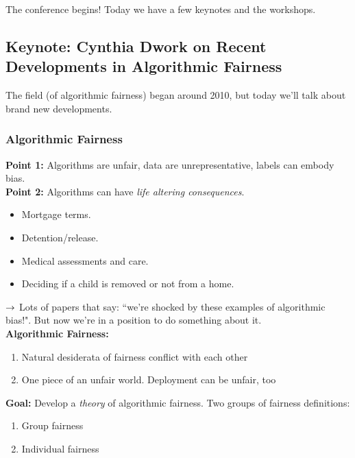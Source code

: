 The conference begins! Today we have a few keynotes and the workshops.


\subsection{Keynote: Cynthia Dwork on Recent Developments in Algorithmic Fairness}

The field (of algorithmic fairness) began around 2010, but today we'll talk about brand new developments.

\subsubsection{Algorithmic Fairness}

{\bf Point 1:} Algorithms are unfair, data are unrepresentative, labels can embody bias. \\

{\bf Point 2:} Algorithms can have {\it life altering consequences}.
\begin{itemize}
    \item Mortgage terms.
    \item Detention/release.
    \item Medical assessments and care.
    \item Deciding if a child is removed or not from a home.
\end{itemize}

$\rightarrow$ Lots of papers that say: ``we're shocked by these examples of algorithmic bias!". But now we're in a position to do something about it. \\

{\bf Algorithmic Fairness:}
\begin{enumerate}
    \item Natural desiderata of fairness conflict with each other
    \item One piece of an unfair world. Deployment can be unfair, too
\end{enumerate}

{\bf Goal:} Develop a {\it theory} of algorithmic fairness. Two groups of fairness definitions:
\begin{enumerate}
    \item Group fairness
    \item Individual fairness
\end{enumerate}


